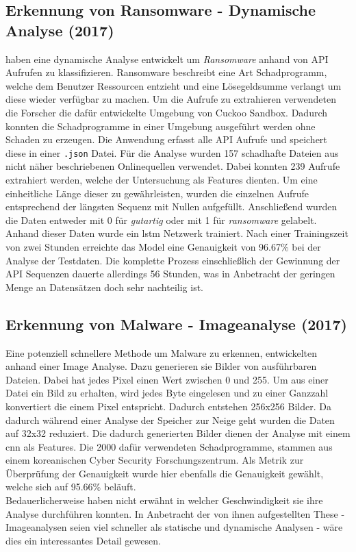 \documentclass[
    12pt, %
    DIV10,
    ngerman, %
    a4paper, %
    oneside, %
    titlepage, %
    parskip=half, %
    headings=normal, %
    listof=totoc, %
    bibliography=totoc, %
    index=totoc, %
    captions=tableheading, %
    final %
]{scrreprt}
\begin{document}
\subsection{Erkennung von Ransomware - Dynamische Analyse (2017)}
\textcite{Maniath2018} haben eine dynamische Analyse entwickelt um \emph{Ransomware} anhand von API Aufrufen zu klassifizieren. Ransomware beschreibt eine Art Schadprogramm, welche dem Benutzer Ressourcen entzieht und eine Lösegeldsumme verlangt um diese wieder verfügbar zu machen. Um die Aufrufe zu extrahieren verwendeten die Forscher die dafür entwickelte Umgebung von Cuckoo Sandbox. Dadurch konnten die Schadprogramme in einer Umgebung ausgeführt werden ohne Schaden zu erzeugen. Die Anwendung erfasst alle API Aufrufe und speichert diese in einer \texttt{.json} Datei. Für die Analyse wurden 157 schadhafte Dateien aus nicht näher beschriebenen Onlinequellen verwendet. Dabei konnten 239 Aufrufe extrahiert werden, welche der Untersuchung als Features dienten. Um eine einheitliche Länge dieser zu gewährleisten, wurden die einzelnen Aufrufe entsprechend der längsten Sequenz mit Nullen aufgefüllt. Anschließend wurden die Daten entweder mit 0 für \emph{gutartig} oder mit 1 für \emph{ransomware} gelabelt. Anhand dieser Daten wurde ein \ac{lstm} Netzwerk trainiert. Nach einer Trainingszeit von zwei Stunden erreichte das Model eine Genauigkeit von 96.67\% bei der Analyse der Testdaten. Die komplette Prozess einschließlich der Gewinnung der API Sequenzen dauerte allerdings 56 Stunden, was in Anbetracht der geringen Menge an Datensätzen doch sehr nachteilig ist.
%
\subsection{Erkennung von Malware - Imageanalyse (2017)}
Eine potenziell schnellere Methode um Malware zu erkennen, entwickelten \textcite{8190895} anhand einer Image Analyse. Dazu generieren sie Bilder von ausführbaren Dateien. Dabei hat jedes Pixel einen Wert zwischen 0 und 255. Um aus einer Datei ein Bild zu erhalten, wird jedes Byte eingelesen und zu einer Ganzzahl konvertiert die einem Pixel entspricht. Dadurch entstehen 256x256 Bilder. Da dadurch während einer Analyse der Speicher zur Neige geht wurden die Daten auf 32x32 reduziert. Die dadurch generierten Bilder dienen der Analyse mit einem \ac{cnn} als Features. Die 2000 dafür verwendeten Schadprogramme, stammen aus einem koreanischen Cyber Security Forschungszentrum. Als Metrik zur Überprüfung der Genauigkeit wurde hier ebenfalls die Genauigkeit gewählt, welche sich auf 95.66\% beläuft.\\
Bedauerlicherweise haben \textcite{8190895} nicht erwähnt in welcher Geschwindigkeit sie ihre Analyse durchführen konnten. In Anbetracht der von ihnen aufgestellten These - Imageanalysen seien viel schneller als statische und dynamische Analysen - wäre dies ein interessantes Detail gewesen.
\end{document}

